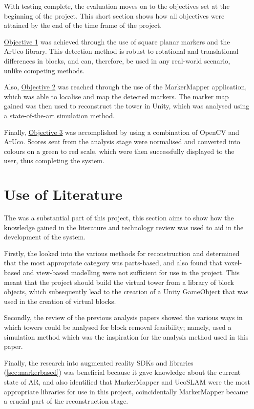 With testing complete, the evaluation moves on to the objectives set at the beginning of the project. This short section shows how all objectives were attained by the end of the time frame of the project.

\hyperref[obj:detect]{Objective 1} was achieved through the use of square planar markers and the ArUco library. This detection method is robust to rotational and translational differences in blocks, and can, therefore, be used in any real-world scenario, unlike competing methods.

Also, \hyperref[obj:analysis]{Objective 2} was reached through the use of the MarkerMapper application, which was able to localise and map the detected markers. The marker map gained was then used to reconstruct the tower in Unity, which was analysed using a state-of-the-art simulation method.

Finally, \hyperref[obj:display]{Objective 3} was accomplished by using a combination of OpenCV and ArUco. Scores sent from the analysis stage were normalised and converted into colours on a green to red scale, which were then successfully displayed to the user, thus completing the system.

\section{Use of Literature}

The  was a substantial part of this project, this section aims to show how the knowledge gained in the literature and technology review was used to aid in the development of the system.

Firstly, the  looked into the various methods for reconstruction and determined that the most appropriate category was parts-based, and also found that voxel-based and view-based modelling were not sufficient for use in the project. This meant that the project should build the virtual tower from a library of block objects, which subsequently lead to the creation of a Unity GameObject that was used in the creation of virtual blocks.

Secondly, the review of the previous \jenga{} analysis papers showed the various ways in which towers could be analysed for block removal feasibility; namely, \citet{jengarobot} used a simulation method which was the inspiration for the analysis method used in this paper.

Finally, the research into augmented reality SDKs and libraries (\cref{sec:markerbased}) was beneficial because it gave knowledge about the current state of AR, and also identified that MarkerMapper and UcoSLAM were the most appropriate libraries for use in this project, coincidentally MarkerMapper became a crucial part of the reconstruction stage.

